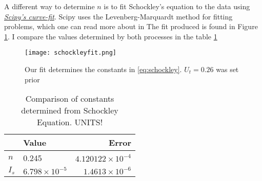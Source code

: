 \documentclass{article}
\begin{document}
A different way to determine $n$ is to fit Schockley's equation to the data using \href{https://docs.scipy.org/doc/scipy/reference/generated/scipy.optimize.curve_fit.html}{\textit{Scipy's curve-fit}}.
Scipy uses the Levenberg-Marquardt method for fitting problems, which one can read more about in \cite{LMref}
The fit produced is found in Figure \ref{fig:schockfit}.
I compare the values determined by both processes in the table \ref{tab:schocktable}

\begin{figure}
    \centering
    \texttt{[image: schockleyfit.png]}
    \caption{Our fit determines the constants in \ref{eq:schockley}. $U_t = 0.26$ was set prior }
    \label{fig:schockfit}
\end{figure}

\begin{table}
    \centering
    \begin{tabular}{l|l r}
         & Value & Error\\
        \hline
        $n$ & 0.245 & $4.120122 \times 10^{-4}$\\
        $I_s$ & $6.798 \times 10^{-5}$ & $1.4613 \times 10^{-6}$
    \end{tabular}
    \caption{Comparison of constants determined from Schockley Equation. UNITS!}
    \label{tab:schocktable}
\end{table}
\end{document}
